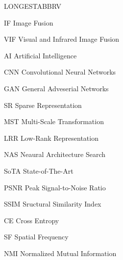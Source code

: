 \begin{theglossary}{LONGESTABBRV}

\item[IF] Image Fusion
\item[VIF] Visual and Infrared Image Fusion 
\item[AI] Artificial Intelligence
\item[CNN] Convolutional Neural Networks
\item[GAN] General Adveserial Networks   
\item[SR] Sparse Representation
\item[MST] Multi-Scale Transformation
\item[LRR] Low-Rank Representation
\item[NAS] Neaural Architecture Search
\item[SoTA] State-of-The-Art
\item[PSNR] Peak Signal-to-Noise Ratio
\item[SSIM] Sructural Similarity Index
\item[CE] Cross Entropy
\item[SF] Spatial Frequency
\item[NMI] Normalized Mutual Information
\end{theglossary}
